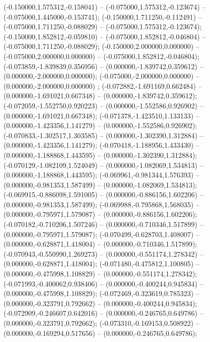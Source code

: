  (-0.150000,1.575312,-0.158041) -- (-0.075000,1.575312,-0.123674) -- (-0.075000,1.445000,-0.153741);
 (-0.150000,1.711250,-0.112491) -- (-0.075000,1.711250,-0.088029) -- (-0.075000,1.575312,-0.123674);
 (-0.150000,1.852812,-0.059810) -- (-0.075000,1.852812,-0.046804) -- (-0.075000,1.711250,-0.088029);
 (-0.150000,2.000000,0.000000) -- (-0.075000,2.000000,0.000000) -- (-0.075000,1.852812,-0.046804);
 (-0.073859,-1.839839,0.356956) -- (0.000000,-1.839742,0.359612) -- (0.000000,-2.000000,0.000000);
 (-0.075000,-2.000000,0.000000) -- (0.000000,-2.000000,0.000000) ;
 (-0.072882,-1.691169,0.662484) -- (0.000000,-1.691021,0.667348) -- (0.000000,-1.839742,0.359612);
 (-0.072059,-1.552750,0.920223) -- (0.000000,-1.552586,0.926902) -- (0.000000,-1.691021,0.667348);
 (-0.071378,-1.423510,1.133133) -- (0.000000,-1.423356,1.141279) -- (0.000000,-1.552586,0.926902);
 (-0.070833,-1.302517,1.303585) -- (0.000000,-1.302390,1.312884) -- (0.000000,-1.423356,1.141279);
 (-0.070418,-1.188956,1.433430) -- (0.000000,-1.188868,1.443595) -- (0.000000,-1.302390,1.312884);
 (-0.070129,-1.082109,1.524049) -- (0.000000,-1.082069,1.534813) -- (0.000000,-1.188868,1.443595);
 (-0.069961,-0.981344,1.576393) -- (0.000000,-0.981353,1.587499) -- (0.000000,-1.082069,1.534813);
 (-0.069915,-0.886098,1.591005) -- (0.000000,-0.886156,1.602206) -- (0.000000,-0.981353,1.587499);
 (-0.069988,-0.795868,1.568035) -- (0.000000,-0.795971,1.579087) -- (0.000000,-0.886156,1.602206);
 (-0.070182,-0.710206,1.507246) -- (0.000000,-0.710346,1.517899) -- (0.000000,-0.795971,1.579087);
 (-0.070499,-0.628703,1.408007) -- (0.000000,-0.628871,1.418004) -- (0.000000,-0.710346,1.517899);
 (-0.070943,-0.550990,1.269273) -- (0.000000,-0.551174,1.278342) -- (0.000000,-0.628871,1.418004);
 (-0.071480,-0.475812,1.100805) -- (0.000000,-0.475998,1.108829) -- (0.000000,-0.551174,1.278342);
 (-0.071993,-0.400062,0.938406) -- (0.000000,-0.400244,0.945834) -- (0.000000,-0.475998,1.108829);
 (-0.072469,-0.323619,0.785323) -- (0.000000,-0.323791,0.792662) -- (0.000000,-0.400244,0.945834);
 (-0.072909,-0.246607,0.642016) -- (0.000000,-0.246765,0.649786) -- (0.000000,-0.323791,0.792662);
 (-0.073310,-0.169153,0.508922) -- (0.000000,-0.169294,0.517656) -- (0.000000,-0.246765,0.649786);
